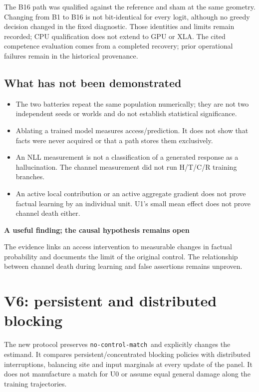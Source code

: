 \documentclass[11pt,a4paper]{article}
\newcommand{\status}{\texttt{no-control-match}}
\newcommand{\callout}[2]{\par\vspace{3pt}\begingroup\setlength{\fboxsep}{9pt}%
  \colorbox{light}{\begin{minipage}{\dimexpr\linewidth-2\fboxsep\relax}%
  {\sffamily\bfseries\color{ink}#1}\par\small #2\end{minipage}}\endgroup\par\vspace{3pt}}
\newcommand{\pageend}{\clearpage}
\begin{document}
The B16 path was qualified against the reference and sham at the same geometry.
Changing from B1 to B16 is not bit-identical for every logit, although no greedy
decision changed in the fixed diagnostic. Those identities and limits remain
recorded; CPU qualification does not extend to GPU or XLA. The cited competence
evaluation comes from a completed recovery; prior operational failures remain
in the historical provenance.

\subsection{What has not been demonstrated}
\begin{itemize}
\item The two batteries repeat the same population numerically; they are not
two independent seeds or worlds and do not establish statistical significance.
\item Ablating a trained model measures access/prediction. It does not show
that facts were never acquired or that a path stores them exclusively.
\item An NLL measurement is not a classification of a generated response as
a hallucination. The channel measurement did not run H/T/C/R training branches.
\item An active local contribution or an active aggregate gradient does not
prove factual learning by an individual unit. U1's small mean effect does not
prove channel death either.
\end{itemize}

\callout{A useful finding; the causal hypothesis remains open}{
The evidence links an access intervention to measurable changes in factual
probability and documents the limit of the original control. The relationship
between channel death during learning and false assertions remains unproven.}

\pageend
\section{V6: persistent and distributed blocking}
\label{sec:v6}

The new protocol preserves \status\ and explicitly changes the estimand.
It compares persistent/concentrated blocking policies with distributed
interruptions, balancing site and input marginals at every update of the panel.
It does not manufacture a match for U0 or assume equal general damage along
the training trajectories.
\end{document}
